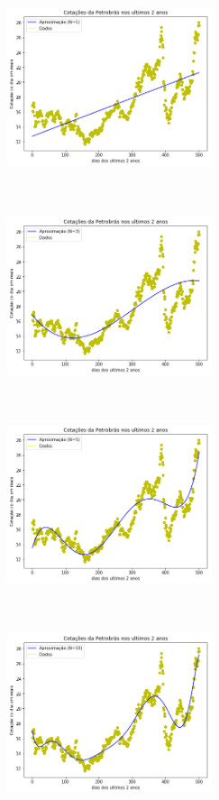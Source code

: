 \documentclass{article}
\begin{document}
\newpage
\begin{figure}[!htb]
\includegraphics [width=6cm,height=6cm]{G1.png}
\includegraphics [width=6cm,height=6cm]{G3.png}
\includegraphics [width=6cm,height=6cm]{G5.png}
\includegraphics [width=6cm,height=6cm]{G10.png}

\end{figure}
\end{document}
